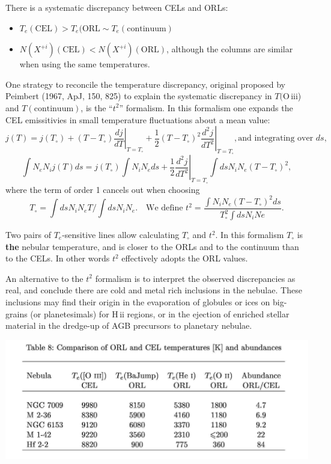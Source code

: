 There is a systematic discrepancy between CELs and ORLs:\begin{itemize}
\item $T_e(\mathrm{CEL}) > T_e(\mathrm{ORL} \sim T_e(\mathrm{continuum})$
 
\item $N(X^{+i})(\mathrm{CEL}) < N(X^{+i})(\mathrm{ORL})$, although
the columns are similar when using the same temperatures.
\end{itemize}



One strategy to reconcile the temperature discrepancy, original
proposed by Peimbert (1967, ApJ, 150, 825) to explain the systematic
discrepancy in $T($O\,{\sc iii}) and $T(\mathrm{continuum})$, is the
``$t^2$'' formalism. In this formalism one expands the CEL emissitivies
in small temperature fluctuations about a mean value:
\[
j(T) = j(T_\circ) + (T-T_\circ)
\left. \frac{dj}{dT}\right|_{T=T_\circ} + \left. \frac{1}{2} (T-T_\circ)^2
\frac{d^2j}{dT^2}\right|_{T=T_\circ}, \text{and integrating over  $ds$,}
\]
\[
\int N_e N_i j(T) ds = j(T_\circ) \int N_i N_e ds + \left. \frac{1}{2}
\frac{d^2j}{dT^2}\right|_{T=T_\circ} \int ds N_i N_e (T-T_\circ)^2,
\]
where the term of order 1 cancels out when choosing\[
T_\circ = \int ds N_i N_e T / \int ds N_i N_e \text{. ~~We define } 
t^2 = \frac{\int N_i N_e (T-T_\circ)^2 ds}{T_\circ^2  \int
ds N_i Ne }.\]

Two pairs of $T_e$-sensitive lines allow calculating $T_\circ$ and
$t^2$. In this formalism $T_\circ$ is {\bf the }  nebular temperature,
and is closer to the ORLs and to the continuum than to the CELs. In
other words $t^2$ effectively adopts the ORL values. 



An alternative to the $t^2$ formalism is to interpret the observed
discrepancies as real, and conclude there are cold and metal rich
inclusions in the nebulae. These inclusions may find their origin in
the evaporation of globules or ices on big-grains (or planetesimals)
for H\,{\sc ii} regions, or in the ejection of enriched stellar
material in the dredge-up of AGB precursors to planetary nebulae.


\begin{center}
      \includegraphics[width=\textwidth,height=!]{./C/orl_cel_table.jpg}
\end{center}

